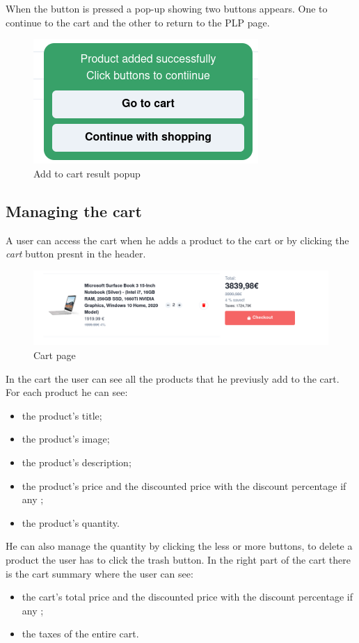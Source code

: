 When the button is pressed a pop-up showing two buttons appears. One to continue to the cart and the other to return to the PLP page.
\begin{figure}[!ht]
    \caption{Add to cart result popup}
    \vspace{10px}
    \includegraphics[scale=0.5]{../../../../Images/userManual/cartResult.png}
    \centering
\end{figure}
\subsection{Managing the cart}
A user can access the cart when he adds a product to the cart or by clicking the \textit{cart} button presnt in the header.
\begin{figure}[!ht]
    \caption{Cart page}
    \vspace{10px}
    \includegraphics[scale=0.3]{../../../../Images/userManual/cart.png}
    \centering
\end{figure}
In the cart the user can see all the products that he previusly add to the cart. For each product he can see:
\begin{itemize}
    \item the product's title;
    \item the product's image;
    \item the product's description;
    \item the product's price and the discounted price with the discount percentage if any ;
    \item the product's quantity.
\end{itemize}
He can also manage the quantity by clicking the less or more buttons, to delete a product the user has to click the trash button. In the right part of the cart there is the cart summary where the user can see:
\begin{itemize}
    \item the cart's total price and the discounted price with the discount percentage if any ;
    \item the taxes of the entire cart.
\end{itemize}

